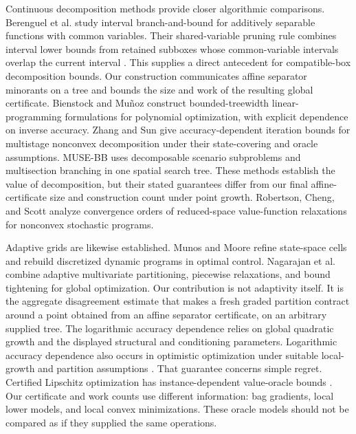 Continuous decomposition methods provide closer algorithmic comparisons.
Berenguel et al. \citep{BerenguelEtAl2013} study interval branch-and-bound
for additively separable functions with common variables. Their
shared-variable pruning rule combines interval lower bounds from retained
subboxes whose common-variable intervals overlap the current interval
\citep[Proposition~1 and Theorem~2]{BerenguelEtAl2013}.
This supplies a direct antecedent for compatible-box decomposition bounds.
Our construction communicates affine separator minorants on a tree and
bounds the size and work of the resulting global certificate.
Bienstock and Mu\~noz \citep{BienstockMunoz2018} construct
bounded-treewidth linear-programming formulations for polynomial
optimization, with explicit dependence on inverse accuracy.
Zhang and Sun \citep{ZhangSun2022} give accuracy-dependent iteration
bounds for multistage nonconvex decomposition under their state-covering
and oracle assumptions. MUSE-BB \citep{LangiuEtAl2025} uses decomposable
scenario subproblems and multisection branching in one spatial search
tree. These methods establish the value of decomposition, but their
stated guarantees differ from our final affine-certificate size and
construction count under point growth.
Robertson, Cheng, and Scott \citep{RobertsonChengScott2025} analyze
convergence orders of reduced-space value-function relaxations for
nonconvex stochastic programs.

Adaptive grids are likewise established. Munos and Moore
\citep{MunosMoore2002} refine state-space cells and rebuild discretized
dynamic programs in optimal control. Nagarajan et al.
\citep{NagarajanEtAl2019} combine adaptive multivariate partitioning,
piecewise relaxations, and bound tightening for global optimization.
Our contribution is not adaptivity itself. It is the aggregate disagreement
estimate that makes a fresh graded partition contract around a point
obtained from an affine separator certificate, on an arbitrary supplied
tree. The logarithmic accuracy dependence relies on global quadratic
growth and the displayed structural and conditioning parameters.
Logarithmic accuracy dependence also occurs in optimistic optimization
under suitable local-growth and partition assumptions
\citep{Munos2011OptimisticOptimization}. That guarantee concerns simple
regret. Certified Lipschitz optimization has instance-dependent value-oracle
bounds \citep{BachocCesariGerchinovitz2021}. Our certificate and work counts
use different information: bag gradients, local lower models, and local
convex minimizations. These oracle models should not be compared as if
they supplied the same operations.

